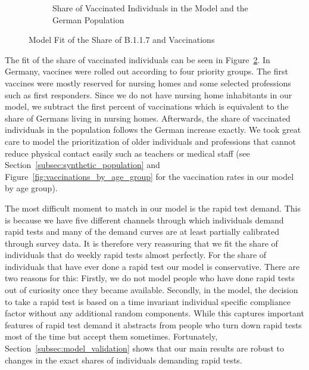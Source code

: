 \begin{figure}[ht]
\begin{subfigure}[b]{0.425\textwidth}
        \caption{Share of Vaccinated Individuals in the Model and the German Population}
        \label{fig:fit_vaccinations}
    \end{subfigure}
    \caption{Model Fit of the Share of B.1.1.7 and Vaccinations}
\end{figure}

The fit of the share of vaccinated individuals can be seen in
Figure~\ref{fig:fit_vaccinations}. In Germany, vaccines were rolled out according to
four priority groups. The first vaccines were mostly reserved for nursing homes and some
selected professions such as first responders. Since we do not have nursing home
inhabitants in our model, we subtract the first percent of vaccinations which is
equivalent to the share of Germans living in nursing homes. Afterwards, the share of
vaccinated individuals in the population follows the German increase exactly. We took
great care to model the prioritization of older individuals and professions that cannot
reduce physical contact easily such as teachers or medical staff (see
Section~\ref{subsec:synthetic_population} and Figure~\ref{fig:vaccinations_by_age_group}
for the vaccination rates in our model by age group).

\FloatBarrier

The most difficult moment to match in our model is the rapid test demand. This is
because we have five different channels through which individuals demand rapid tests and
many of the demand curves are at least partially calibrated through survey data. It is
therefore very reassuring that we fit the share of individuals that do weekly rapid
tests almost perfectly. For the share of individuals that have ever done a rapid test
our model is conservative. There are two reasons for this: Firstly, we do not model
people who have done rapid tests out of curiosity once they became available. Secondly,
in the model, the decision to take a rapid test is based on a time invariant individual
specific compliance factor without any additional random components. While this captures
important features of rapid test demand it abstracts from people who turn down rapid
tests most of the time but accept them sometimes. Fortunately,
Section~\ref{subsec:model_validation} shows that our main results are robust to changes
in the exact shares of individuals demanding rapid tests.

